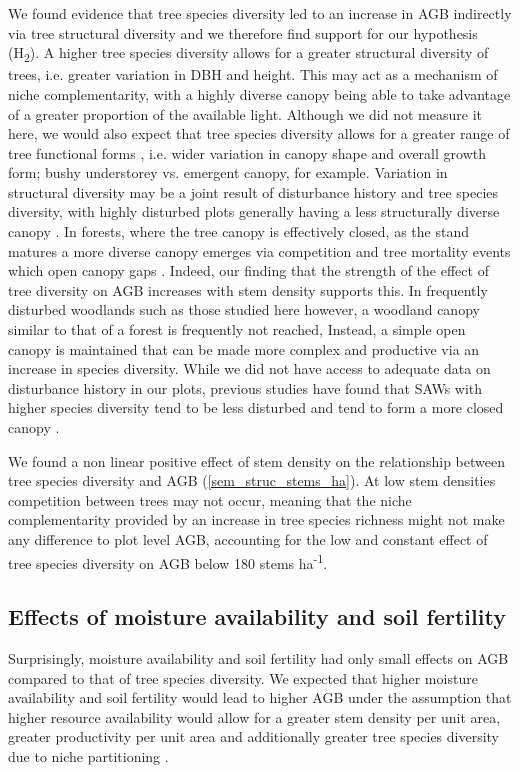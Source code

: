 \documentclass[11pt,a4paper]{article}
\newcommand{\textapprox}{\raisebox{0.5ex}{\texttildelow}}  %
\begin{document}
We found evidence that tree species diversity led to an increase in AGB indirectly via tree structural diversity and we therefore find support for our hypothesis (H\textsubscript{2}). A higher tree species diversity allows for a greater structural diversity of trees, i.e. greater variation in DBH and height. This may act as a mechanism of niche complementarity, with a highly diverse canopy being able to take advantage of a greater proportion of the available light. Although we did not measure it here, we would also expect that tree species diversity allows for a greater range of tree functional forms \citep{}, i.e. wider variation in canopy shape and overall growth form; bushy understorey vs. emergent canopy, for example. Variation in structural diversity may be a joint result of disturbance history and tree species diversity, with highly disturbed plots generally having a less structurally diverse canopy \citep{LaRue2019}. In forests, where the tree canopy is effectively closed, as the stand matures a more diverse canopy emerges via competition and tree mortality events which open canopy gaps \citep{Muscolo2014}. Indeed, our finding that the strength of the effect of tree diversity on AGB increases with stem density supports this. In frequently disturbed woodlands such as those studied here however, a woodland canopy similar to that of a forest is frequently not reached, Instead, a simple open canopy is maintained that can be made more complex and productive via an increase in species diversity. While we did not have access to adequate data on disturbance history in our plots, previous studies have found that SAWs with higher species diversity tend to be less disturbed and tend to form a more closed canopy \citep{Chidumayo2013, Mutowo2012}.

We found a non linear positive effect of stem density on the relationship between tree species diversity and AGB (\autoref{sem_struc_stems_ha}). At low stem densities competition between trees may not occur, meaning that the niche complementarity provided by an increase in tree species richness might not make any difference to plot level AGB, accounting for the low and constant effect of tree species diversity on AGB below \textapprox{}180 stems ha\textsuperscript{-1}.

\subsection*{Effects of moisture availability and soil fertility}

Surprisingly, moisture availability and soil fertility had only small effects on AGB compared to that of tree species diversity. We expected that higher moisture availability and soil fertility would lead to higher AGB under the assumption that higher resource availability would allow for a greater stem density per unit area, greater productivity per unit area and additionally greater tree species diversity due to niche partitioning \citep{Kraaij2006, Shirima2015}.
\end{document}
